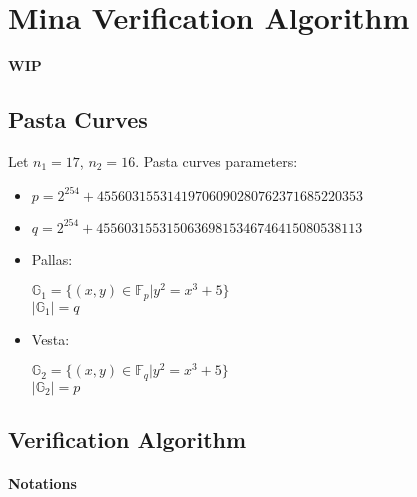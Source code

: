 \section{Mina Verification Algorithm}
\label{section:preliminaries}
\textbf{WIP}

\subsection{Pasta Curves}

Let $n_1 = 17$, $n_2 = 16$.
Pasta curves parameters:
\begin{itemize}
    \item $p = 2^{254} + 45560315531419706090280762371685220353$
    \item $q = 2^{254} + 45560315531506369815346746415080538113$
    \item Pallas:
    \begin{center}
        $\mathbb{G}_1 = \{ (x, y) \in \mathbb{F}_p | y^2 = x^3 + 5 \}$ \\
        $|\mathbb{G}_1| = q$
    \end{center}
    \item Vesta:
    \begin{center}
        $\mathbb{G}_2 = \{ (x, y) \in \mathbb{F}_q | y^2 = x^3 + 5 \}$ \\
        $|\mathbb{G}_2| = p$
    \end{center}
\end{itemize}

\subsection{Verification Algorithm}

\paragraph{Notations}

